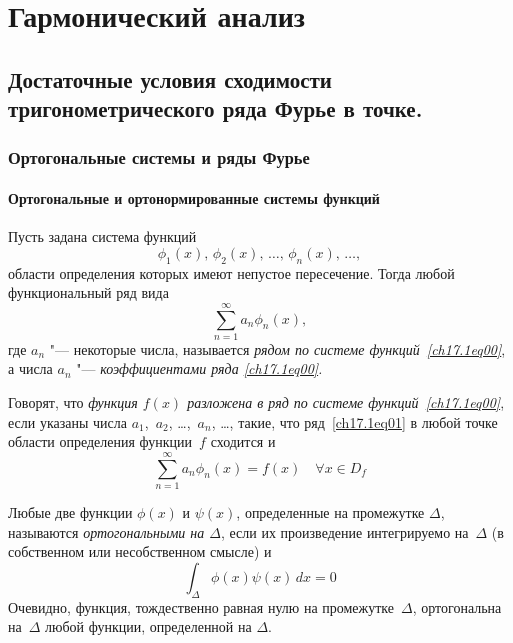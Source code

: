 \part[Гармонический анализ]{Гармонический анализ}%

\chapter{Достаточные условия сходимости тригонометрического ряда Фурье в точке.}
\section{Ортогональные системы и ряды Фурье}
\subsection{Ортогональные и ортонормированные системы функций}
Пусть задана система функций 
\begin{equation} \label{ch17.1eq00}
\phi_1(x),\, \phi_2(x),\, \ldots,\, \phi_n(x),\, \ldots,
\end{equation}
области определения которых имеют непустое пересечение. Тогда любой функциональный ряд вида
\begin{equation} \label{ch17.1eq01}
\sum_{n = 1}^{\infty} a_n \phi_n(x),
\end{equation}
где $a_n$ "--- некоторые числа, называется \textit{рядом по системе функций~\eqref{ch17.1eq00}}, а числа $a_n$ "--- \textit{коэффициентами ряда \eqref{ch17.1eq00}.}

Говорят, что \textit{функция $f(x)$ разложена в ряд по системе функций~\eqref{ch17.1eq00}}, если указаны числа $a_1$,~$a_2$, \dots,~$a_n$, \dots, такие, что ряд~\eqref{ch17.1eq01} в любой точке области определения функции~$f$ сходится и 
$$
\sum_{n = 1}^{\infty} a_n \phi_n(x)=f(x) \quad \forall x \in D_f
$$ 

\begin{defn}
Любые две функции $\phi(x)$	и $\psi(x)$, определенные на промежутке $\Delta$, называются \textit{ортогональными на $\Delta$}, если их произведение интегрируемо на~$\Delta$ (в собственном или несобственном смысле) и
$$
\int_\Delta\phi(x) \psi(x)\,dx=0
$$
Очевидно, функция, тождественно равная нулю на промежутке~$\Delta$, ортогональна на~$\Delta$ любой функции, определенной на $\Delta$.
\end{defn}

